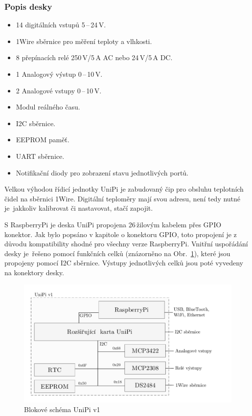 \subsubsection{Popis desky}
\begin{itemize}
	\item 14 digitálních vstupů 5\,–\,24\,V. 
	\item 1Wire sběrnice pro měření teploty a vlhkosti. 
	\item 8 přepínacích relé 250\,V/5\,A AC nebo 24\,V/5\,A DC.
	\item 1 Analogový výstup 0\,–\,10\,V.
	\item 2 Analogové vstupy 0\,–\,10\,V.
	\item Modul reálného času.
	\item I2C sběrnice.
	\item EEPROM paměť.
	\item UART sběrnice.
	\item Notifikační diody pro zobrazení stavu jednotlivých portů.
\end{itemize}

\vspace{10pt}
Velkou výhodou řídicí jednotky UniPi je zabudovaný čip pro obsluhu teplotních čidel na sběrnici 1Wire. Digitální teploměry mají svou adresu, není tedy nutné je~jakkoliv kalibrovat či nastavovat, stačí zapojit.

S RaspberryPi je deska UniPi propojena 26\,žilovým kabelem přes GPIO konektor. Jak bylo popsáno v kapitole o konektoru GPIO, toto propojení je z důvodu kompatibility shodné pro všechny verze RaspberryPi. Vnitřní uspořádání desky je~řešeno pomocí funkčních celků  (znázorněno na Obr.~\ref{SchemaBlok1}), které jsou propojeny pomocí I2C sběrnice. Výstupy jednotlivých celků jsou poté vyvedeny na konektory desky.
 
\begin{figure}[!ht]
\vspace{-20pt}
  \begin{center}
    \includegraphics[scale=0.85]{obrazky/unipi_schema1}
  \end{center}
	\vspace{-30pt}
  \caption{Blokové schéma UniPi v1}
	\label{SchemaBlok1}
	
\end{figure}

